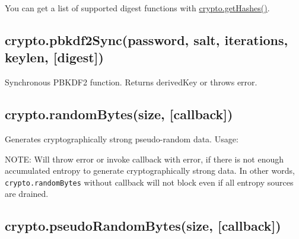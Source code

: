 You can get a list of supported digest functions with
\hyperref[cryptoux5fcryptoux5fgethashes]{crypto.getHashes()}.

\subsection{crypto.pbkdf2Sync(password, salt, iterations, keylen,
{[}digest{]})}\label{crypto.pbkdf2syncpassword-salt-iterations-keylen-digest}

Synchronous PBKDF2 function. Returns derivedKey or throws error.

\subsection{crypto.randomBytes(size,
{[}callback{]})}\label{crypto.randombytessize-callback}

Generates cryptographically strong pseudo-random data. Usage:

\begin{Shaded}
\end{Shaded}

NOTE: Will throw error or invoke callback with error, if there is not
enough accumulated entropy to generate cryptographically strong data. In
other words, \texttt{crypto.randomBytes} without callback will not block
even if all entropy sources are drained.

\subsection{crypto.pseudoRandomBytes(size,
{[}callback{]})}\label{crypto.pseudorandombytessize-callback}

